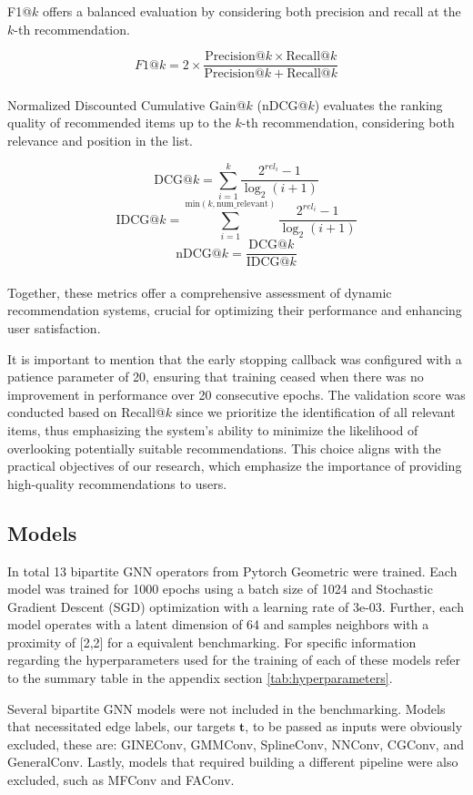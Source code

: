\documentclass{scrartcl}
\begin{document}
F1@$k$ offers a balanced evaluation by considering both precision and recall at the $k$-th recommendation. 

\[ F1@k = 2 \times \frac{\text{Precision@$k$} \times \text{Recall@$k$}}{\text{Precision@$k$} + \text{Recall@$k$}} \] \\ 

Normalized Discounted Cumulative Gain@$k$ (nDCG@$k$) evaluates the ranking quality of recommended items up to the $k$-th recommendation, considering both relevance and position in the list. 

\[ \text{DCG@$k$} = \sum_{i=1}^{k} \frac{2^{rel_i} - 1}{\log_2(i+1)} \]
\[ \text{IDCG@$k$} = \sum_{i=1}^{\text{min}(k, \text{num\_relevant})} \frac{2^{rel_i} - 1}{\log_2(i+1)} \]
\[ \text{nDCG@$k$} = \frac{\text{DCG@$k$}}{\text{IDCG@$k$}} \] \\ 

Together, these metrics offer a comprehensive assessment of dynamic recommendation systems, crucial for optimizing their performance and enhancing user satisfaction.

It is important to mention that the early stopping callback was configured with a patience parameter of 20, ensuring that training ceased when there was no improvement in performance over 20 consecutive epochs. The validation score was conducted based on Recall@$k$ since we prioritize the identification of all relevant items, thus emphasizing the system's ability to minimize the likelihood of overlooking potentially suitable recommendations. This choice aligns with the practical objectives of our research, which emphasize the importance of providing high-quality recommendations to users.

\subsection{Models}

\quad In total 13 bipartite GNN operators from Pytorch Geometric were trained. Each model was trained for 1000 epochs using a batch size of 1024 and Stochastic Gradient Descent (SGD) optimization with a learning rate of 3e-03. Further, each model operates with a latent dimension of 64 and samples neighbors with a proximity of [2,2] for a equivalent benchmarking. For specific information regarding the hyperparameters used for the training of each of these models refer to the summary table in the appendix section \ref{tab:hyperparameters}.

Several bipartite GNN models were not included in the benchmarking. Models that necessitated edge labels, our targets $\mathbf{t}$, to be passed as inputs were obviously excluded, these are: GINEConv\cite{gineconv}, GMMConv\cite{gmmconv}, SplineConv\cite{splineconv}, NNConv\cite{nnconv}, CGConv\cite{cgconv}, and GeneralConv\cite{generalconv}. Lastly, models that required building a different pipeline were also excluded, such as MFConv\cite{mfconv} and FAConv\cite{faconv}.
\end{document}

